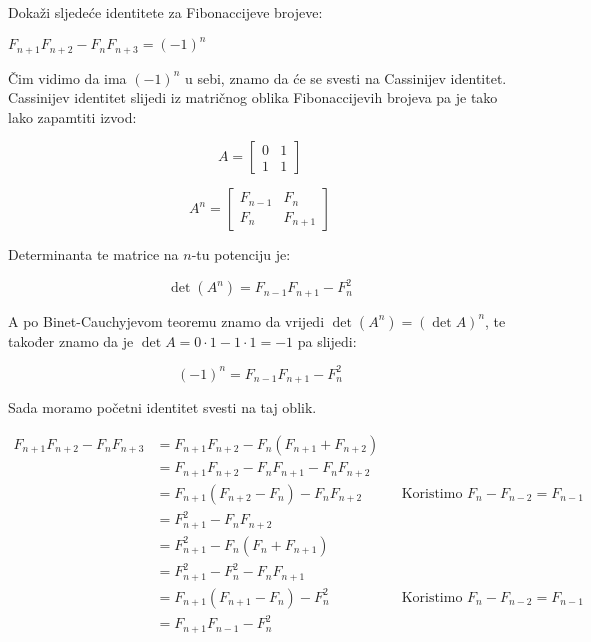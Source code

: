 \documentclass[exam.tex]{subfiles}
\begin{document}
	\begin{subtask}
		Dokaži sljedeće identitete za Fibonaccijeve brojeve:
	
		\( F_{n + 1} F_{n + 2} - F_n F_{n + 3} = (-1)^n \)\\
	\end{subtask}
	
	Čim vidimo da ima \( (-1)^n \) u sebi, znamo da će se svesti na Cassinijev identitet. Cassinijev identitet slijedi iz matričnog oblika Fibonaccijevih brojeva pa je tako lako zapamtiti izvod:
	
	$$ A =  \begin{bmatrix}
		0 & 1 \\
		1 & 1 
	\end{bmatrix}  $$
	
	$$ A^n =  \begin{bmatrix}
		F_{n - 1} & F_n \\
		F_n & F_{n + 1}
	\end{bmatrix} $$
	
	Determinanta te matrice na \(n\)-tu potenciju je:
	
	\[ \det (A^n) = F_{n - 1} F_{n + 1} - F^2_n \]
	
	A po Binet-Cauchyjevom teoremu znamo da vrijedi \( \det (A^n) = (\det A)^n \), te također znamo da je \( \det A = 0 \cdot 1 - 1 \cdot 1 = -1 \) pa slijedi:
	
	\[ (-1)^n = F_{n - 1} F_{n + 1} - F^2_n \]
	
	Sada moramo početni identitet svesti na taj oblik. 
	
	\begin{align*}
		F_{n + 1} F_{n + 2} - F_n F_{n + 3} &= F_{n + 1} F_{n + 2} - F_n (F_{n + 1} + F_{n + 2}) \\
		&= F_{n + 1} F_{n + 2} - F_n F_{n + 1} - F_n F_{n + 2} \\
		&= F_{n + 1} (F_{n + 2} - F_n) - F_n F_{n + 2} && \text{Koristimo } F_n - F_{n - 2} = F_{n - 1}\\
		&= F^2_{n + 1} - F_n F_{n + 2} \\
		&= F^2_{n + 1} - F_n (F_n + F_{n + 1}) \\
		&= F^2_{n + 1} - F^2_n - F_n F_{n + 1} \\
		&= F_{n + 1} (F_{n + 1} - F_n) - F_n^2 && \text{Koristimo } F_n - F_{n - 2} = F_{n - 1}\\
		&= F_{n + 1} F_{n - 1} - F_n^2
	\end{align*}
\end{document}
